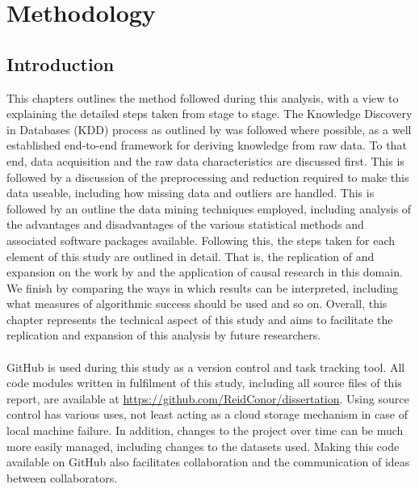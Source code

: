 %
%
%
%

\chapter{Methodology}\label{C.Methodology}
\section{Introduction}
{This chapters outlines the method followed during this analysis, with a view to explaining the detailed steps taken from stage to stage. The Knowledge Discovery in Databases (KDD) process as outlined by \cite{fayyad1996kdd} was followed where possible, as a well established end-to-end framework for deriving knowledge from raw data. To that end, data acquisition and the raw data characteristics are discussed first. This is followed by a discussion of the preprocessing and reduction required to make this data useable, including how missing data and outliers are handled. This is followed by an outline the data mining techniques employed, including analysis of the advantages and disadvantages of the various statistical methods and associated software packages available. Following this, the steps taken for each element of this study are outlined in detail. That is, the replication of and expansion on the work by \cite{moldovan2015learning} and the application of causal research in this domain. We finish by comparing the ways in which results can be interpreted, including what measures of algorithmic success should be used and so on. Overall, this chapter represents the technical aspect of this study and aims to facilitate the replication and expansion of this analysis by future researchers. \\\\
GitHub is used during this study as a version control and task tracking tool. All code modules written in fulfilment of this study, including all source files of this report, are available at \url {https://github.com/ReidConor/dissertation}. Using source control has various uses, not least acting as a cloud storage mechanism in case of local machine failure. In addition, changes to the project over time can be much more easily managed, including changes to the datasets used. Making this code available on GitHub also facilitates collaboration and the communication of ideas between collaborators.   }
